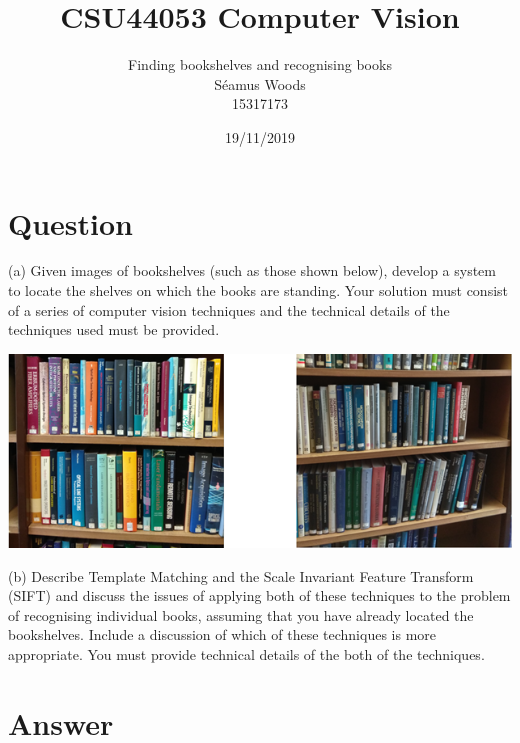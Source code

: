 \documentclass[12pt]{report}
\title{CSU44053 Computer Vision}
\author{Finding bookshelves and recognising books \\ Séamus Woods \\ 15317173}
\date{19/11/2019}
\begin{document}
\maketitle
\newpage

\section{Question}
(a) Given images of bookshelves (such as those shown below), develop a system to locate the shelves on which the books are standing. Your solution must consist of a series of computer vision techniques and the technical details of the techniques used must be provided.
\begin{center}
\includegraphics[scale=1]{Bookcases.png}
\end{center}
(b) Describe Template Matching and the Scale Invariant Feature Transform (SIFT) and discuss the issues of applying both of these techniques to the problem of recognising individual books, assuming that you have already located the bookshelves.  Include a discussion of which of these techniques is more appropriate.  You must provide technical details of the both of the techniques.  


\newpage
\section{Answer}
\end{document}

